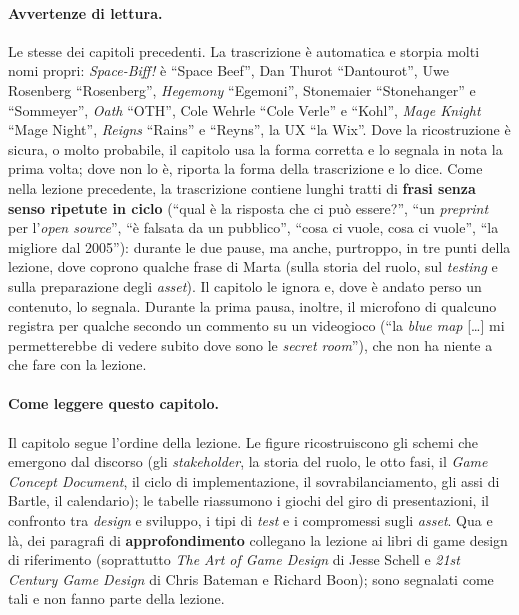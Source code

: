 \paragraph{Avvertenze di lettura.} Le stesse dei capitoli precedenti. La trascrizione è
automatica e storpia molti nomi propri: \emph{Space-Biff!} è ``Space Beef'', Dan Thurot
``Dantourot'', Uwe Rosenberg ``Rosenberg'', \emph{Hegemony} ``Egemoni'', Stonemaier
``Stonehanger'' e ``Sommeyer'', \emph{Oath} ``OTH'', Cole Wehrle ``Cole Verle'' e
``Kohl'', \emph{Mage Knight} ``Mage Night'', \emph{Reigns} ``Rains'' e ``Reyns'', la UX
``la Wix''. Dove la ricostruzione è sicura, o molto probabile, il capitolo usa la forma
corretta e lo segnala in nota la prima volta; dove non lo è, riporta la forma della
trascrizione e lo dice. Come nella lezione precedente, la trascrizione contiene lunghi
tratti di \textbf{frasi senza senso ripetute in ciclo} (``qual è la risposta che ci può
essere?'', ``un \emph{preprint} per l'\emph{open source}'', ``è falsata da un
pubblico'', ``cosa ci vuole, cosa ci vuole'', ``la migliore dal 2005''): durante le due
pause, ma anche, purtroppo, in tre punti della lezione, dove coprono qualche frase di
Marta (sulla storia del ruolo, sul \emph{testing} e sulla preparazione degli
\emph{asset}). Il capitolo le ignora e, dove è andato perso un contenuto, lo segnala.
Durante la prima pausa, inoltre, il microfono di qualcuno registra per qualche secondo
un commento su un videogioco (``la \emph{blue map} [\ldots] mi permetterebbe di vedere
subito dove sono le \emph{secret room}''), che non ha niente a che fare con la lezione.

\paragraph{Come leggere questo capitolo.} Il capitolo segue l'ordine della lezione. Le
figure ricostruiscono gli schemi che emergono dal discorso (gli \emph{stakeholder}, la
storia del ruolo, le otto fasi, il \emph{Game Concept Document}, il ciclo di
implementazione, il sovrabilanciamento, gli assi di Bartle, il calendario); le tabelle
riassumono i giochi del giro di presentazioni, il confronto tra \emph{design} e sviluppo,
i tipi di \emph{test} e i compromessi sugli \emph{asset}. Qua e là, dei paragrafi di
\textbf{approfondimento} collegano la lezione ai libri di game design di riferimento
(soprattutto \emph{The Art of Game Design} di Jesse Schell e \emph{21st Century Game
Design} di Chris Bateman e Richard Boon); sono segnalati come tali e non fanno parte
della lezione.

